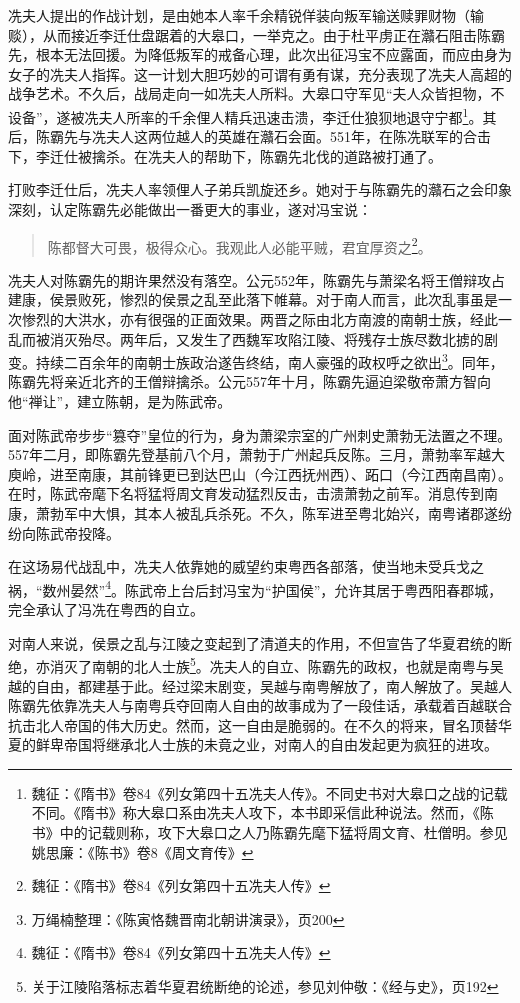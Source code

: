 冼夫人提出的作战计划，是由她本人率千余精锐佯装向叛军输送赎罪财物（输赕），从而接近李迁仕盘踞着的大皋口，一举克之。由于杜平虏正在灨石阻击陈霸先，根本无法回援。为降低叛军的戒备心理，此次出征冯宝不应露面，而应由身为女子的冼夫人指挥。这一计划大胆巧妙的可谓有勇有谋，充分表现了冼夫人高超的战争艺术。不久后，战局走向一如冼夫人所料。大皋口守军见“夫人众皆担物，不设备”，遂被冼夫人所率的千余俚人精兵迅速击溃，李迁仕狼狈地退守宁都\footnote{魏征：《隋书》卷84《列女第四十五冼夫人传》。不同史书对大皋口之战的记载不同。《隋书》称大皋口系由冼夫人攻下，本书即采信此种说法。然而，《陈书》中的记载则称，攻下大皋口之人乃陈霸先麾下猛将周文育、杜僧明。参见姚思廉：《陈书》卷8《周文育传》}。其后，陈霸先与冼夫人这两位越人的英雄在灨石会面。551年，在陈冼联军的合击下，李迁仕被擒杀。在冼夫人的帮助下，陈霸先北伐的道路被打通了。

打败李迁仕后，冼夫人率领俚人子弟兵凯旋还乡。她对于与陈霸先的灨石之会印象深刻，认定陈霸先必能做出一番更大的事业，遂对冯宝说：

\begin{quote}
	陈都督大可畏，极得众心。我观此人必能平贼，君宜厚资之\footnote{魏征：《隋书》卷84《列女第四十五冼夫人传》}。
\end{quote}


冼夫人对陈霸先的期许果然没有落空。公元552年，陈霸先与萧梁名将王僧辩攻占建康，侯景败死，惨烈的侯景之乱至此落下帷幕。对于南人而言，此次乱事虽是一次惨烈的大洪水，亦有很强的正面效果。两晋之际由北方南渡的南朝士族，经此一乱而被消灭殆尽。两年后，又发生了西魏军攻陷江陵、将残存士族尽数北掳的剧变。持续二百余年的南朝士族政治遂告终结，南人豪强的政权呼之欲出\footnote{万绳楠整理：《陈寅恪魏晋南北朝讲演录》，页200}。同年，陈霸先将亲近北齐的王僧辩擒杀。公元557年十月，陈霸先逼迫梁敬帝萧方智向他“禅让”，建立陈朝，是为陈武帝。

面对陈武帝步步“篡夺”皇位的行为，身为萧梁宗室的广州刺史萧勃无法置之不理。557年二月，即陈霸先登基前八个月，萧勃于广州起兵反陈。三月，萧勃率军越大庾岭，进至南康，其前锋更已到达巴山（今江西抚州西）、跖口（今江西南昌南）。在时，陈武帝麾下名将猛将周文育发动猛烈反击，击溃萧勃之前军。消息传到南康，萧勃军中大惧，其本人被乱兵杀死。不久，陈军进至粤北始兴，南粤诸郡遂纷纷向陈武帝投降。

在这场易代战乱中，冼夫人依靠她的威望约束粤西各部落，使当地未受兵戈之祸，“数州晏然”\footnote{魏征：《隋书》卷84《列女第四十五冼夫人传》}。陈武帝上台后封冯宝为“护国侯”，允许其居于粤西阳春郡城，完全承认了冯冼在粤西的自立。

对南人来说，侯景之乱与江陵之变起到了清道夫的作用，不但宣告了华夏君统的断绝，亦消灭了南朝的北人士族\footnote{关于江陵陷落标志着华夏君统断绝的论述，参见刘仲敬：《经与史》，页192}。冼夫人的自立、陈霸先的政权，也就是南粤与吴越的自由，都建基于此。经过梁末剧变，吴越与南粤解放了，南人解放了。吴越人陈霸先依靠冼夫人与南粤兵夺回南人自由的故事成为了一段佳话，承载着百越联合抗击北人帝国的伟大历史。然而，这一自由是脆弱的。在不久的将来，冒名顶替华夏的鲜卑帝国将继承北人士族的未竟之业，对南人的自由发起更为疯狂的进攻。

